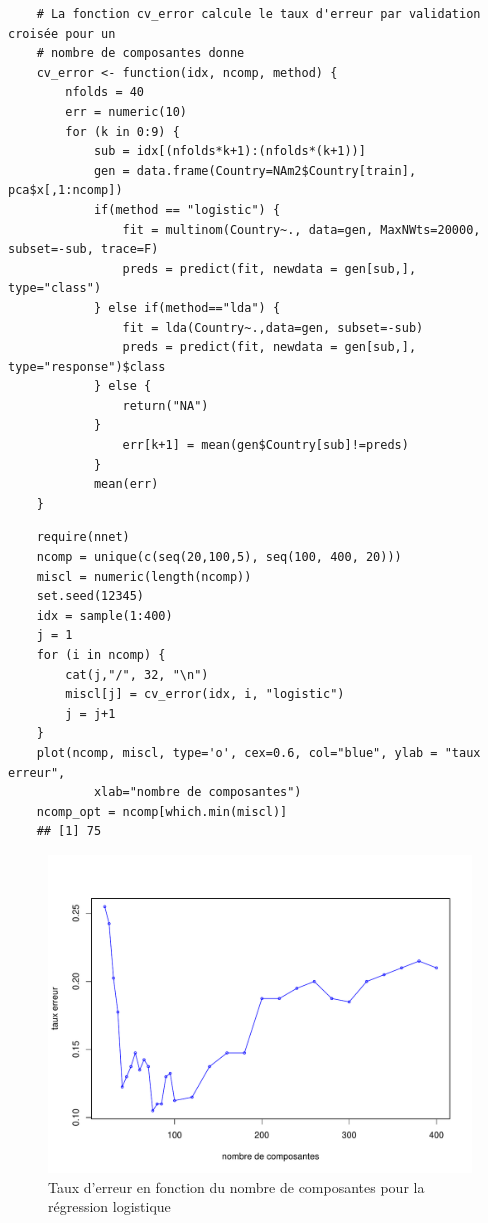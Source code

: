 \documentclass[12pt,a4paper]{article}
\begin{document}
\begin{lstlisting}
	# La fonction cv_error calcule le taux d'erreur par validation croisée pour un 
	# nombre de composantes donne
	cv_error <- function(idx, ncomp, method) {
		nfolds = 40
		err = numeric(10)
		for (k in 0:9) {
			sub = idx[(nfolds*k+1):(nfolds*(k+1))]
			gen = data.frame(Country=NAm2$Country[train], pca$x[,1:ncomp])
			if(method == "logistic") {
				fit = multinom(Country~., data=gen, MaxNWts=20000, subset=-sub, trace=F)
				preds = predict(fit, newdata = gen[sub,], type="class")
			} else if(method=="lda") {
				fit = lda(Country~.,data=gen, subset=-sub)
				preds = predict(fit, newdata = gen[sub,], type="response")$class
			} else {
				return("NA")
			}
				err[k+1] = mean(gen$Country[sub]!=preds)
			}
			mean(err)
	}
\end{lstlisting}
\begin{lstlisting}
	require(nnet)
	ncomp = unique(c(seq(20,100,5), seq(100, 400, 20)))
	miscl = numeric(length(ncomp))
	set.seed(12345)
	idx = sample(1:400)
	j = 1
	for (i in ncomp) {
		cat(j,"/", 32, "\n")
		miscl[j] = cv_error(idx, i, "logistic")
		j = j+1
	}
	plot(ncomp, miscl, type='o', cex=0.6, col="blue", ylab = "taux erreur",
			xlab="nombre de composantes")
	ncomp_opt = ncomp[which.min(miscl)]
	## [1] 75
\end{lstlisting}
\begin{figure}[h!]
	\begin{center}
		\includegraphics[scale=0.5]{figures/nopt_log.pdf}
		\caption{Taux d'erreur en fonction du nombre de composantes pour la régression logistique}
		\label{fig:nopt_log}
	\end{center}
\end{figure}
\end{document}
